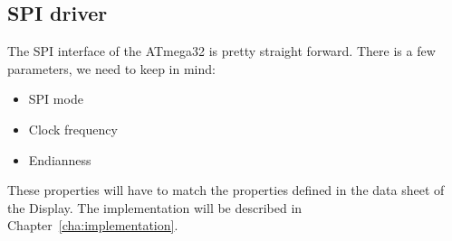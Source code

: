 \subsection{SPI driver}

The SPI interface of the ATmega32 is pretty straight forward. There is a few parameters, we need to keep in mind:

\begin{itemize}
\item SPI mode
\item Clock frequency
\item Endianness
\end{itemize}

These properties will have to match the properties defined in the data sheet of the Display. The implementation will be described in Chapter~\ref{cha:implementation}.
